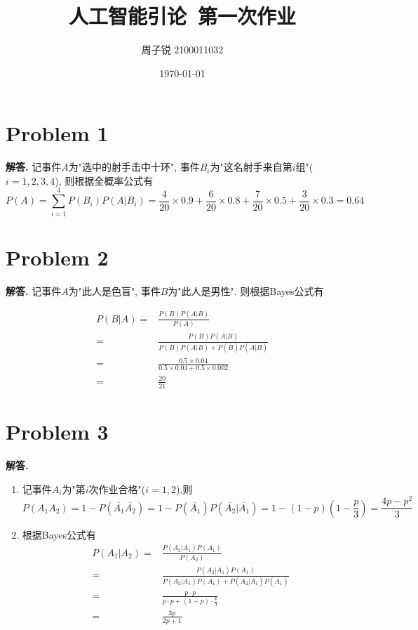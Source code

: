 \documentclass[11pt]{article}
\newenvironment{solution}{\par\noindent\textbf{解答. }}{\par}
\newcommand{\ol}{\overline}
\begin{document}
	
	\title{\textbf{人工智能引论\ 第一次作业}}
	\author{周子锐 2100011032}
	\date{\today}
	\maketitle
	
	\section{Problem 1}
	
	\begin{solution}
		记事件$A$为"选中的射手击中十环", 事件$B_i$为"这名射手来自第$i$组"($i=1,2,3,4$), 则根据全概率公式有$$P(A)=\sum_{i=1}^4 P(B_i)P(A|B_i)=\frac{4}{20}\times 0.9+\frac{6}{20}\times 0.8+\frac{7}{20}\times 0.5+\frac{3}{20}\times 0.3=0.64$$
	\end{solution}

	\section{Problem 2}
	
	\begin{solution}
		记事件$A$为"此人是色盲", 事件$B$为"此人是男性". 则根据Bayes公式有
		
		$$\begin{aligned}
			P(B|A)=&\frac{P(B)P(A|B)}{P(A)}\\
			=& \frac{P(B)P(A|B)}{P(B)P(A|B)+P(\bar{B})P(A|\bar{B})} \\
			=&\frac{0.5\times 0.04}{0.5\times 0.04+0.5\times 0.002} \\
			=& \frac{20}{21}
		\end{aligned}$$
	\end{solution}
	
	\section{Problem 3}
	\begin{solution}
		\begin{enumerate}[(1)]
			\item 记事件$A_i$为"第$i$次作业合格"($i=1,2$),则$$P(A_1A_2)=1-P(\ol{A_1}\ol{A_2})=1-P(\ol{A_1})P(\ol{A_2}|\ol{A_1})=1-(1-p)(1-\frac{p}{3})=\frac{4p-p^2}{3}$$
			\item 根据Bayes公式有 $$\begin{aligned}
				P(A_1|A_2)=&\frac{P(A_2|A_1)P(A_1)}{P(A_2)}\\
				=&\frac{P(A_2|A_1)P(A_1)}{P(A_2|A_1)P(A_1)+P(A_2|\ol{A_1})P(\ol{A_1})}\\
				=&\frac{p\cdot p}{p\cdot p+(1-p)\cdot \frac{p}{3}}\\
				=&\frac{3p}{2p+1}
			\end{aligned}$$
		\end{enumerate}
	\end{solution}
\end{document}
